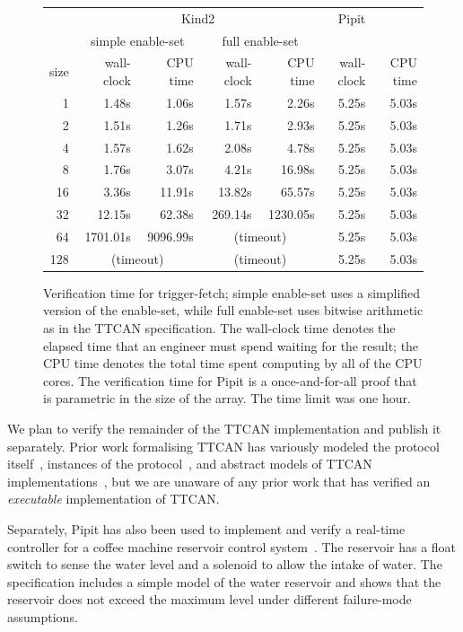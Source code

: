 \documentclass[a4paper,UKenglish,cleveref, autoref, thm-restate,anonymous]{lipics-v2021}
\begin{document}
\begin{figure}
  \center
\begin{tabular}{r|rr|rr|rr}
  & \multicolumn{4}{c|}{Kind2} & Pipit \\
  & \multicolumn{2}{c|}{simple enable-set} & \multicolumn{2}{c|}{full enable-set} & \\
  size & wall-clock & CPU time & wall-clock & CPU time & wall-clock & CPU time \\
  \hline
  
 1 & 1.48s&1.06s
 & 1.57s&2.26s
 & 5.25s&5.03s \\
 2 & 1.51s&1.26s
 & 1.71s&2.93s
 & 5.25s&5.03s \\
 4 & 1.57s&1.62s
 & 2.08s&4.78s
 & 5.25s&5.03s \\
 8 & 1.76s&3.07s
 & 4.21s&16.98s
 & 5.25s&5.03s \\
 16 & 3.36s&11.91s
 & 13.82s&65.57s
 & 5.25s&5.03s \\
 32 & 12.15s&62.38s
 & 269.14s&1230.05s
 & 5.25s&5.03s \\
 64 & 1701.01s&9096.99s
 &  \multicolumn{2}{c|}{(timeout)}  & 5.25s&5.03s \\
 128 &  \multicolumn{2}{c|}{(timeout)}  &  \multicolumn{2}{c|}{(timeout)}  & 5.25s&5.03s \\





\end{tabular}
\caption{Verification time for trigger-fetch; simple enable-set uses a simplified version of the enable-set, while full enable-set uses bitwise arithmetic as in the TTCAN specification.
The wall-clock time denotes the elapsed time that an engineer must spend waiting for the result; the CPU time denotes the total time spent computing by all of the CPU cores.
The verification time for Pipit is a once-and-for-all proof that is parametric in the size of the array.
The time limit was one hour.}
\label{f:evaluation:kind2-runtime}
\end{figure}

We plan to verify the remainder of the TTCAN implementation and publish it separately.
Prior work formalising TTCAN has variously modeled the protocol itself~\cite{saha2007finite, pan2014modeling,li2018formal},
instances of the protocol~\cite{guo2020model},
and abstract models of TTCAN implementations~\cite{leen2006modeling}, but we are unaware of any prior work that has verified an \emph{executable} implementation of TTCAN.

Separately, Pipit has also been used to implement and verify a real-time controller for a coffee machine reservoir control system~\cite{robinson2023pipit}.
The reservoir has a float switch to sense the water level and a solenoid to allow the intake of water.
The specification includes a simple model of the water reservoir and shows that the reservoir does not exceed the maximum level under different failure-mode assumptions.
 
\end{document}
